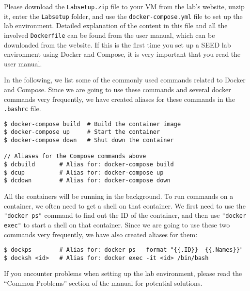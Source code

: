 Please download the
\texttt{Labsetup.zip} file to your VM from the lab's website,
unzip it, enter the \texttt{Labsetup} folder, and 
use the \texttt{docker-compose.yml} file to 
set up the lab environment. Detailed explanation
of the content in this file and all the involved 
\texttt{Dockerfile} can be found from the 
user manual, which can be downloaded from the website. 
If this is the first time you set up a SEED lab environment
using Docker and Compose, it is very important that you read 
the user manual. 

In the following, we list some of the commonly
used commands related to Docker and Compose. 
Since we are going to use 
these commands and several docker commands very
frequently, we have created aliases for these commands
in the \texttt{.bashrc} file.  


\begin{lstlisting}
$ docker-compose build  # Build the container image
$ docker-compose up     # Start the container
$ docker-compose down   # Shut down the container

// Aliases for the Compose commands above
$ dcbuild       # Alias for: docker-compose build
$ dcup          # Alias for: docker-compose up
$ dcdown        # Alias for: docker-compose down
\end{lstlisting}


All the containers will be running in the background. To run
commands on a container, we often need to get a shell on
that container. We first need to use the \texttt{"docker ps"}  
command to find out the ID of the container, and then
use \texttt{"docker exec"} to start a shell on that 
container. Since we are going to use these two commands
very frequently, we have also created aliases
for them:

\begin{lstlisting}
$ dockps        # Alias for: docker ps --format "{{.ID}}  {{.Names}}" 
$ docksh <id>   # Alias for: docker exec -it <id> /bin/bash
\end{lstlisting}


If you encounter problems when setting up the lab environment, 
please read the ``Common Problems'' section of the manual
for potential solutions.

